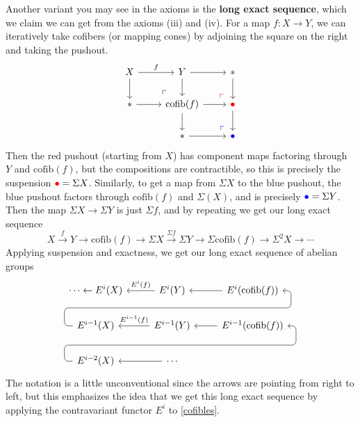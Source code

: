 Another variant you may see in the axioms is the \textbf{long exact sequence}, which we claim we can get from the axioms (iii) and (iv). For a map $f \colon X \to Y$, we can iteratively take cofibers (or mapping cones) by adjoining the square on the right and taking the pushout. \[
\begin{tikzcd}
    X \arrow[r,"f"]\arrow[d] & Y \arrow[d]\arrow[r] & * \arrow[d]\\
    *\arrow[r] & \mathrm{cofib}(f)  \arrow[ul,phantom,"\ulcorner", very near start]\arrow[r] \arrow[d]&{\color{red} \bullet} \arrow[d]\arrow[ul,phantom,red,"\ulcorner", very near start]\\
               &*\arrow[r] & {\color{blue} \bullet} \arrow[ul,phantom,blue,"\ulcorner", very near start]
\end{tikzcd}
\] Then the red pushout (starting from $X$) has component maps factoring through $Y $ and $\mathrm{cofib}(f)$, but the compositions are contractible, so this is precisely the suspension ${\color{red} \bullet} =\Sigma X$. Similarly, to get a map from $\Sigma X$ to the blue pushout, the blue pushout factors through $\mathrm{cofib}(f)$ and $\Sigma (X)$, and is precisely ${\color{blue} \bullet} =\Sigma Y$. Then the map $\Sigma X  \to \Sigma Y$ is just $\Sigma f$, and by repeating we get our long exact sequence 
\begin{equation}\label{cofibles} 
X \overset{f}{\longrightarrow} Y \longrightarrow \mathrm{cofib}(f) \longrightarrow \Sigma X \overset{\Sigma f}{\longrightarrow} \Sigma Y \longrightarrow \Sigma \mathrm{cofib}(f) \longrightarrow \Sigma ^2 X \longrightarrow \cdots 
\end{equation}
Applying suspension and exactness, we get our long exact sequence of abelian groups \[
\begin{tikzcd}
    \cdots \leftarrow E^i (X) & E^i (Y) \arrow[l,"E^i (f)"']\arrow[d, phantom, ""{coordinate, name=Z}] & E^i (\mathrm{cofib}(f)) \arrow[l]\\
E^{i-1}(X) \arrow[urr,
rounded corners,
to path={ -- ([xshift=-2ex]\tikztostart.west)
|- (Z) [near end]\tikztonodes
-| ([xshift=2ex]\tikztotarget.east)
-- (\tikztotarget)}] 
& E^{i-1}(Y)\arrow[l,"E^{i-1}(f)"'] \arrow[d, phantom, ""{coordinate, name=Y}]
& E^{i-1}(\mathrm{cofib}(f))\arrow[l]\\
    E^{i-2}(X)\arrow[urr,
rounded corners,
to path={ -- ([xshift=-2ex]\tikztostart.west)
|- (Y) [near end]\tikztonodes
-| ([xshift=2ex]\tikztotarget.east)
-- (\tikztotarget)}] & \cdots  \arrow[l]&
\end{tikzcd}
\] The notation is a little unconventional since the arrows are pointing from right to left, but this emphasizes the idea that we get this long exact sequence by applying the contravariant functor $E^i $ to \cref{cofibles}.

